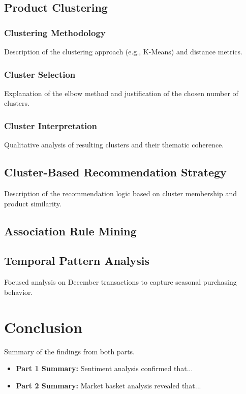 \documentclass[a4paper, 12pt]{article}
\begin{document}
\subsection{Product Clustering}

\subsubsection{Clustering Methodology}
Description of the clustering approach (e.g., K-Means) and distance metrics.

\subsubsection{Cluster Selection}
Explanation of the elbow method and justification of the chosen number of clusters.

\subsubsection{Cluster Interpretation}
Qualitative analysis of resulting clusters and their thematic coherence.

\subsection{Cluster-Based Recommendation Strategy}
Description of the recommendation logic based on cluster membership and product similarity.


\subsection{Association Rule Mining}


\subsection{Temporal Pattern Analysis}
Focused analysis on December transactions to capture seasonal purchasing behavior.  



\section{Conclusion}
Summary of the findings from both parts.
\begin{itemize}
    \item \textbf{Part 1 Summary:} Sentiment analysis confirmed that...
    \item \textbf{Part 2 Summary:} Market basket analysis revealed that...
\end{itemize}
\end{document}
